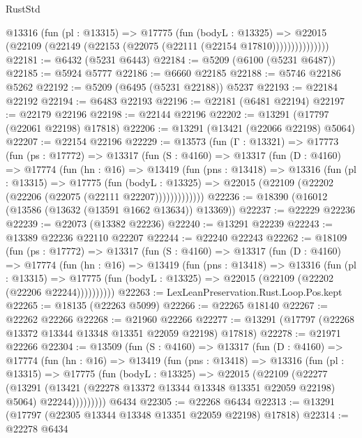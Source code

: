 \begin{lexlean}{RustStd}
\begin{coremodule}
                @13316
                  (fun (pl : @13315) =>
                  @17775
                    (fun (bodyL : @13325) =>
                    @22015 (@22109 (@22149 (@22153 (@22075 (@22111 (@22154 @17810)))))))))))))))
@22181 := @6432 (@5231 @6443)
@22184 := @5209 (@6100 (@5231 @6487))
@22185 := @5924 @5777
@22186 := @6660 @22185
@22188 := @5746 @22186 @5262
@22192 := @5209 (@6495 (@5231 @22188)) @5237
@22193 := @22184 @22192
@22194 := @6483 @22193
@22196 := @22181 (@6481 @22194)
@22197 := @22179 @22196
@22198 := @22144 @22196
@22202 := @13291 (@17797 (@22061 @22198) @17818)
@22206 := @13291 (@13421 (@22066 @22198) @5064)
@22207 := @22154 @22196
@22229 := @13573
    (fun (Γ : @13321) =>
    @17773
      (fun (ps : @17772) =>
      @13317
        (fun (S : @4160) =>
        @13317
          (fun (D : @4160) =>
          @17774
            (fun (hn : @16) =>
            @13419
              (fun (pns : @13418) =>
              @13316
                (fun (pl : @13315) =>
                @17775
                  (fun (bodyL : @13325) =>
                  @22015 (@22109 (@22202 (@22206 (@22075 (@22111 @22207)))))))))))))
@22236 := @18390 (@16012 (@13586 (@13632 (@13591 @1662 @13634)) @13369))
@22237 := @22229 @22236
@22239 := @22073 (@13382 @22236)
@22240 := @13291 @22239
@22243 := @13389 @22236 @22110 @22207
@22244 := @22240 @22243
@22262 := @18109
    (fun (ps : @17772) =>
    @13317
      (fun (S : @4160) =>
      @13317
        (fun (D : @4160) =>
        @17774
          (fun (hn : @16) =>
          @13419
            (fun (pns : @13418) =>
            @13316
              (fun (pl : @13315) =>
              @17775 (fun (bodyL : @13325) => @22015 (@22109 (@22202 (@22206 @22244))))))))))
@22263 := LexLeanPreservation.Rust.Loop.Pos.kept
@22265 := @18135 (@22263 @5099)
@22266 := @22265 @18140
@22267 := @22262 @22266
@22268 := @21960 @22266
@22277 := @13291 (@17797 (@22268 @13372 @13344 @13348 @13351 @22059 @22198) @17818)
@22278 := @21971 @22266
@22304 := @13509
    (fun (S : @4160) =>
    @13317
      (fun (D : @4160) =>
      @17774
        (fun (hn : @16) =>
        @13419
          (fun (pns : @13418) =>
          @13316
            (fun (pl : @13315) =>
            @17775
              (fun (bodyL : @13325) =>
              @22015
                (@22109
                  (@22277
                    (@13291
                      (@13421 (@22278 @13372 @13344 @13348 @13351 @22059 @22198) @5064)
                      @22244)))))))))
    @6434
@22305 := @22268 @6434
@22313 := @13291 (@17797 (@22305 @13344 @13348 @13351 @22059 @22198) @17818)
@22314 := @22278 @6434

\end{coremodule}
\end{lexlean}
